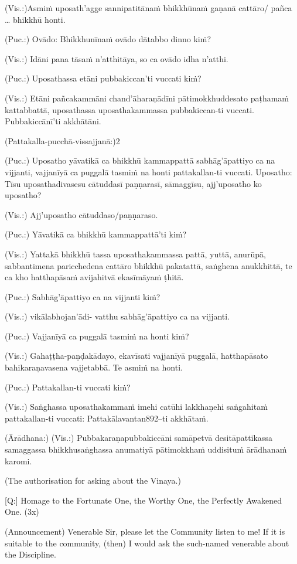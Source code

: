 (Vis.:)Asmiṁ uposath'agge sannipatitānaṁ bhikkhūnaṁ gaṇanā cattāro/
pañca … bhikkhū honti.

(Puc.:) Ovādo: Bhikkhunīnaṁ ovādo dātabbo dinno kiṁ?

(Vis.:) Idāni pana tāsaṁ n'atthitāya, so ca ovādo idha n'atthi.

(Puc.:) Uposathassa etāni pubbakiccan'ti vuccati kiṁ?

(Vis.:) Etāni pañcakammāni chand'āharaṇādīni pātimokkhuddesato
paṭhamaṁ kattabbattā, uposathassa uposathakammassa pubbakiccan-ti
vuccati. Pubbakiccānī'ti akkhātāni.

(Pattakalla-pucchā-vissajjanā:)2

(Puc.:) Uposatho yāvatikā ca bhikkhū kammappattā sabhāg'āpattiyo ca na
vijjanti, vajjanīyā ca puggalā tasmiṁ na honti pattakallan-ti vuccati.
Uposatho: Tīsu uposathadivasesu cātuddasī paṇṇarasī, sāmaggīsu,
ajj'uposatho ko uposatho?

(Vis.:) Ajj'uposatho cātuddaso/paṇṇaraso.

(Puc.:) Yāvatikā ca bhikkhū kammappattā'ti kiṁ?

(Vis.:) Yattakā bhikkhū tassa uposathakammassa pattā, yuttā, anurūpā,
sabbantimena paricchedena cattāro bhikkhū pakatattā, saṅghena
anukkhittā, te ca kho hatthapāsaṁ avijahitvā ekasīmāyaṁ ṭhitā.

(Puc.:) Sabhāg'āpattiyo ca na vijjanti kiṁ?

(Vis.:) vikālabhojan'ādi- vatthu sabhāg'āpattiyo ca na vijjanti.

(Puc.:) Vajjanīyā ca puggalā tasmiṁ na honti kiṁ?

(Vis.:) Gahaṭṭha-paṇḍakādayo, ekavīsati vajjanīyā puggalā, hatthapāsato
bahikaraṇavasena vajjetabbā. Te asmiṁ na honti.

(Puc.:) Pattakallan-ti vuccati kiṁ?

(Vis.:) Saṅghassa uposathakammaṁ imehi catūhi lakkhaṇehi saṅgahitaṁ
pattakallan-ti vuccati: Pattakālavantan892–ti akkhātaṁ.

(Ārādhana:)
(Vis.:) Pubbakaraṇapubbakiccāni samāpetvā desitāpattikassa samaggassa
bhikkhusaṅghassa anumatiyā pātimokkhaṁ uddisituṁ ārādhanaṁ
karomi.

\clearpage

(The authorisation for asking about the Vinaya.)

[Q:] Homage to the Fortunate One, the Worthy One, the Perfectly
Awakened One. (3x)

(Announcement)
Venerable Sir, please let the Community listen to me! If it is suitable
to the community, (then) I would ask the such-named venerable
about the Discipline.

